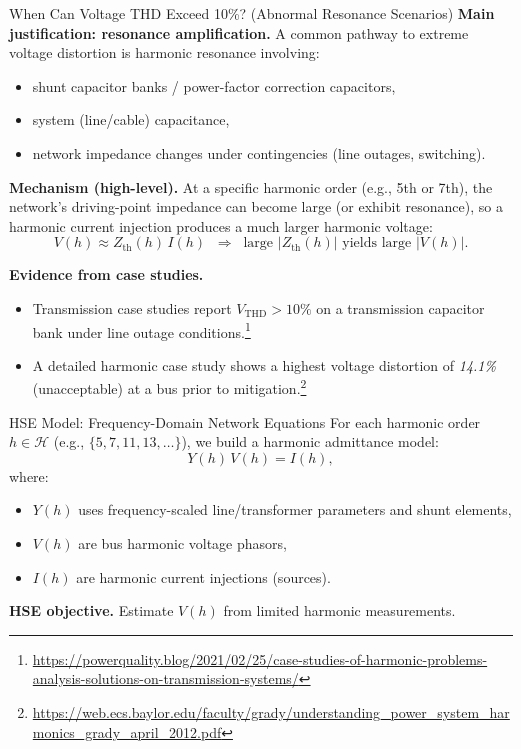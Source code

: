 \documentclass[aspectratio=169]{beamer}
\begin{document}
\begin{frame}{When Can Voltage THD Exceed 10\%? (Abnormal Resonance Scenarios)}
\textbf{Main justification: resonance amplification.}
A common pathway to extreme voltage distortion is harmonic resonance involving:
\begin{itemize}
  \item shunt capacitor banks / power-factor correction capacitors,
  \item system (line/cable) capacitance,
  \item network impedance changes under contingencies (line outages, switching).
\end{itemize}

\vspace{0.4em}
\textbf{Mechanism (high-level).}
At a specific harmonic order (e.g., 5th or 7th), the network's driving-point impedance can become large (or exhibit resonance),
so a harmonic current injection produces a much larger harmonic voltage:
\[
V(h) \approx Z_{\mathrm{th}}(h)\, I(h) \;\;\Rightarrow\;\; \text{large }|Z_{\mathrm{th}}(h)| \text{ yields large } |V(h)|.
\]

\vspace{0.4em}
\textbf{Evidence from case studies.}
\begin{itemize}
  \item Transmission case studies report $V_{\mathrm{THD}}>10\%$ on a transmission capacitor bank under line outage conditions.\footnote{\url{https://powerquality.blog/2021/02/25/case-studies-of-harmonic-problems-analysis-solutions-on-transmission-systems/}}
  \item A detailed harmonic case study shows a highest voltage distortion of \emph{14.1\%} (unacceptable) at a bus prior to mitigation.\footnote{\url{https://web.ecs.baylor.edu/faculty/grady/understanding_power_system_harmonics_grady_april_2012.pdf}}
\end{itemize}
\end{frame}


\begin{frame}{HSE Model: Frequency-Domain Network Equations}
For each harmonic order $h \in \mathcal{H}$ (e.g., $\{5,7,11,13,\dots\}$), we build a harmonic admittance model:
\[
Y(h)\,V(h)=I(h),
\]
where:
\begin{itemize}
  \item $Y(h)$ uses frequency-scaled line/transformer parameters and shunt elements,
  \item $V(h)$ are bus harmonic voltage phasors,
  \item $I(h)$ are harmonic current injections (sources).
\end{itemize}

\vspace{0.4em}
\textbf{HSE objective.} Estimate $V(h)$ from limited harmonic measurements.
\end{frame}
\end{document}
